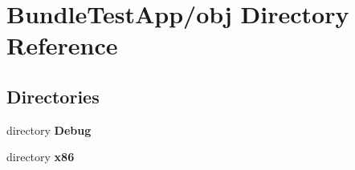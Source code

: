 \section{Bundle\+Test\+App/obj Directory Reference}
\label{dir_0508259a1b40ead209ed7ddb22beb319}
\subsection*{Directories}
\begin{DoxyCompactItemize}
\item 
directory {\bf Debug}
\item 
directory {\bf x86}
\end{DoxyCompactItemize}
